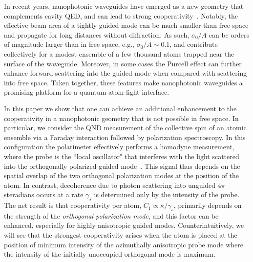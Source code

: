 \documentclass[preprint,aps,pra,onecolumn,superscriptaddress]{revtex4-1} %
\begin{document}
In recent years, nanophotonic waveguides have emerged as a new geometry that complements cavity QED, and can lead to strong cooperativity~\cite{Vetsch2010Optical, Chang2013,  Hung2013, Yu2014,  Douglas2015, Asenjo-Garcia2017Exponential, Qi2016}.  Notably, the effective beam area of a tightly guided mode can be much smaller than free space and propagate for long distances without diffraction.  As such,  $\sigma_0/A$ can be orders of magnitude larger than in free space, e.g., $\sigma_0/A \sim 0.1$, and contribute collectively for a modest ensemble of a few thousand atoms trapped near the surface of the waveguide.  Moreover, in some cases the Purcell effect can further enhance forward scattering into the guided mode when compared with scattering into free space.  Taken together, these features make  nanophotonic waveguides a promising platform for a quantum atom-light interface.  
 
In this paper we show that one can achieve an additional enhancement to the cooperativity in a nanophotonic geometry that is not possible in free space. In particular, we consider the QND measurement of the collective spin of an atomic ensemble via a Faraday interaction followed by polarization spectroscopy.  In this configuration the polarimeter effectively performs a homodyne measurement, where the probe is the ``local oscillator" that interferes with the light scattered into the orthogonally polarized guided mode~\cite{Baragiola2014}.   This signal thus depends on the spatial overlap of the two orthogonal polarization modes at the position of the atom.  In contrast, decoherence due to photon scattering into unguided $4 \pi$ steradians occurs at a rate $\gamma_s$ is determined only by the intensity of the probe.   The net result is that cooperativity per atom, $C_1 \propto \kappa/\gamma_s$, primarily depends on the strength of the {\em orthogonal polarization mode}, and this factor can be enhanced, especially for highly anisotropic guided modes.  Counterintuitively, we will see that the strongest cooperativity arises when the atom is placed at the position of  minimum intensity of the azimuthally anisotropic probe mode where the intensity of the initially unoccupied orthogonal mode is maximum. 
\end{document}
